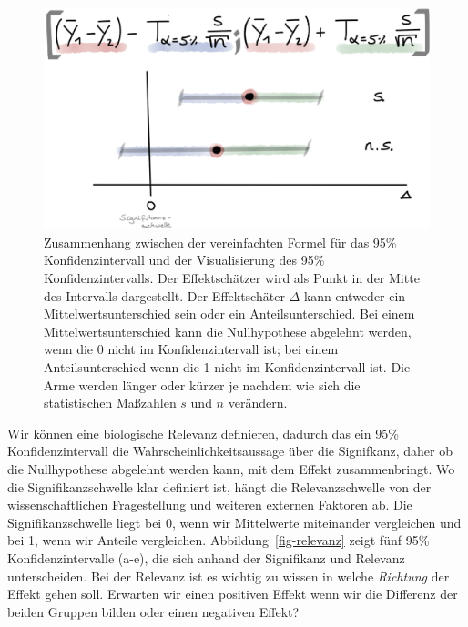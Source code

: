 \documentclass[
  letterpaper,
  DIV=11,
  oneside]{scrreport}
\begin{document}
\begin{figure}

{\centering \includegraphics[width=1\textwidth,height=\textheight]{./images/ci-01.png}

}

\caption{\label{fig-ki-01}Zusammenhang zwischen der vereinfachten Formel
für das 95\% Konfidenzintervall und der Visualisierung des 95\%
Konfidenzintervalls. Der Effektschätzer wird als Punkt in der Mitte des
Intervalls dargestellt. Der Effektschäter \(\Delta\) kann entweder ein
Mittelwertsunterschied sein oder ein Anteilsunterschied. Bei einem
Mittelwertsunterschied kann die Nullhypothese abgelehnt werden, wenn die
0 nicht im Konfidenzintervall ist; bei einem Anteilsunterschied wenn die
1 nicht im Konfidenzintervall ist. Die Arme werden länger oder kürzer je
nachdem wie sich die statistischen Maßzahlen \(s\) und \(n\) verändern.}

\end{figure}

{}

Wir können eine biologische Relevanz definieren, dadurch das ein 95\%
Konfidenzintervall die Wahrscheinlichkeitsaussage über die Signifkanz,
daher ob die Nullhypothese abgelehnt werden kann, mit dem Effekt
zusammenbringt. Wo die Signifikanzschwelle klar definiert ist, hängt die
Relevanzschwelle von der wissenschaftlichen Fragestellung und weiteren
externen Faktoren ab. Die Signifikanzschwelle liegt bei 0, wenn wir
Mittelwerte miteinander vergleichen und bei 1, wenn wir Anteile
vergleichen. Abbildung~\ref{fig-relevanz} zeigt fünf 95\%
Konfidenzintervalle (a-e), die sich anhand der Signifikanz und Relevanz
unterscheiden. Bei der Relevanz ist es wichtig zu wissen in welche
\emph{Richtung} der Effekt gehen soll. Erwarten wir einen positiven
Effekt wenn wir die Differenz der beiden Gruppen bilden oder einen
negativen Effekt?
\end{document}
